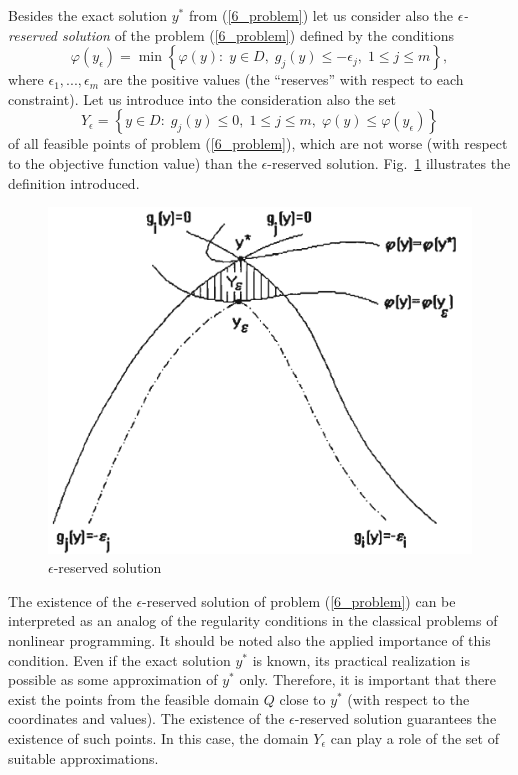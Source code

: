 Besides the exact solution $y^\ast$ from (\ref{6_problem}) let us consider also the \textit{$\epsilon$-reserved solution} of the problem (\ref{6_problem}) defined by the conditions 
\begin{equation}\label{6_eps_r}
\varphi(y_\epsilon) = \min \left\{ \varphi(y): \; y \in D, \; g_j(y) \leq -\epsilon_j, \; 1 \leq j \leq m \right\},
\end{equation}
where $\epsilon_1,...,\epsilon_m$ are the positive values (the ``reserves'' with respect to each constraint). Let us introduce into the consideration also the set
\begin{equation}\label{6_eps_solution}
Y_\epsilon =  \left\{ y \in D: \; g_j(y) \leq 0, \; 1 \leq j \leq m, \; \varphi(y) \leq \varphi(y_\epsilon) \right\}
\end{equation}
of all feasible points of problem (\ref{6_problem}), which are not worse (with respect to the objective function value) than the $\epsilon$-reserved solution. Fig.~\ref{6_fig_1} illustrates the definition introduced.

\begin{figure}[t]
\includegraphics[width=0.7\linewidth]{figures/6_1.png}
\caption{$\epsilon$-reserved solution}
\label{6_fig_1}     
\end{figure}

The existence of the $\epsilon$-reserved solution of problem (\ref{6_problem}) can be interpreted as an analog of the regularity conditions in the classical problems of nonlinear programming. It should be noted also the applied importance of this condition. Even if the exact solution $y^\ast$ is known, its practical realization is possible as some approximation of $y^\ast$ only. Therefore, it is important that there exist the points from the feasible domain $Q$ close to $y^\ast$ (with respect to the coordinates and values). The existence of the $\epsilon$-reserved solution guarantees the existence of such points. In this case, the domain $Y_\epsilon$ can play a role of the set of suitable approximations.

